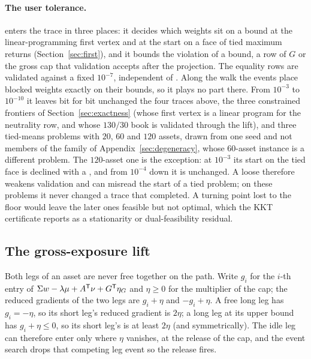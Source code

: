 \paragraph{The user tolerance.}
 enters the trace in three places: it decides which
weights sit on a bound at the linear-programming first vertex and at the start on a face
of tied maximum returns (Section~\ref{sec:first}), and it bounds the violation of a
bound, a row of $G$ or the gross cap that validation accepts after the projection.
The equality rows are validated against a fixed $10^{-7}$, independent of .
Along the walk the events place blocked weights exactly on their bounds, so it plays no
part there. From $10^{-3}$ to $10^{-10}$ it leaves bit for bit unchanged the four traces
above, the three constrained frontiers of Section~\ref{sec:exactness} (whose first
vertex is a linear program for the neutrality row, and whose $130/30$ book is
validated through the lift), and three tied-means problems with $20$, $60$ and $120$
assets, drawn from one seed and not members of the family of
Appendix~\ref{sec:degeneracy}, whose $60$-asset instance is a different problem. The
$120$-asset one is the exception: at $10^{-3}$ its start on the
tied face is declined with a , and from $10^{-4}$ down it is
unchanged. A loose  therefore weakens validation and can misread the start of
a tied problem; on these problems it never changed a trace that completed. A turning point
lost to the floor would leave the later ones feasible but not optimal, which the KKT
certificate reports as a stationarity or dual-feasibility residual.

\subsection{The gross-exposure lift}
\label{sec:liftdetail}

Both legs of an asset are never free together on the path. Write $g_i$ for the $i$-th
entry of $\Sigma w - \lambda\mu + A^{\mathsf{T}}\nu + G^{\mathsf{T}}\eta_G$ and $\eta\ge 0$ for the
multiplier of the cap; the reduced gradients of the two legs are $g_i + \eta$ and
$-g_i + \eta$. A free long leg has $g_i = -\eta$, so its short leg's reduced gradient
is $2\eta$; a long leg at its upper bound has $g_i + \eta \le 0$, so its short leg's is
at least $2\eta$ (and symmetrically). The idle leg can therefore enter only where $\eta$
vanishes, at the release of the cap, and the event search drops that competing leg
event so the release fires.

